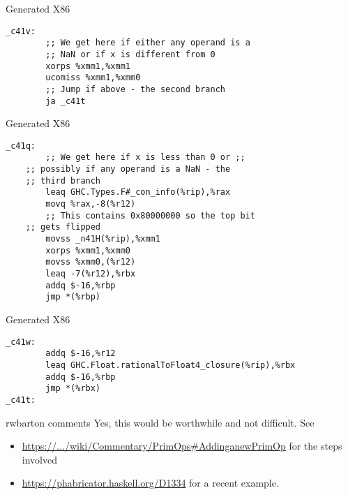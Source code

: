 \documentclass[presentation]{beamer}
\begin{document}
\begin{frame}[fragile]{Generated X86}

\begin{lstlisting}
_c41v:
        ;; We get here if either any operand is a
        ;; NaN or if x is different from 0
        xorps %xmm1,%xmm1
        ucomiss %xmm1,%xmm0
        ;; Jump if above - the second branch
        ja _c41t
\end{lstlisting}
\end{frame}

\begin{frame}[fragile]{Generated X86}

\begin{lstlisting}
_c41q:
        ;; We get here if x is less than 0 or ;;
	;; possibly if any operand is a NaN - the
	;; third branch
        leaq GHC.Types.F#_con_info(%rip),%rax
        movq %rax,-8(%r12)
        ;; This contains 0x80000000 so the top bit
	;; gets flipped
        movss _n41H(%rip),%xmm1
        xorps %xmm1,%xmm0
        movss %xmm0,(%r12)
        leaq -7(%r12),%rbx
        addq $-16,%rbp
        jmp *(%rbp)
\end{lstlisting}
\end{frame}

\begin{frame}[fragile]{Generated X86}

\begin{lstlisting}
_c41w:
        addq $-16,%r12
        leaq GHC.Float.rationalToFloat4_closure(%rip),%rbx
        addq $-16,%rbp
        jmp *(%rbx)
_c41t:
\end{lstlisting}
\end{frame}

\begin{frame}[fragile]{rwbarton comments}
Yes, this would be worthwhile and not difficult. See

\begin{itemize}
\item
  \url{https://.../wiki/Commentary/PrimOps\#AddinganewPrimOp}
  for the steps involved
\item
  \url{https://phabricator.haskell.org/D1334} for a recent
  example.
\end{itemize}

\end{frame}
\end{document}
